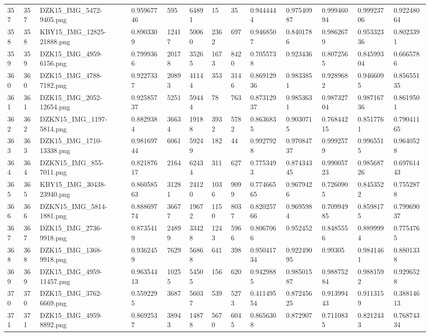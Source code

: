 \documentclass[11pt, a4paper, twoside]{report}
\begin{document}
\begin{longtable}[c]{@{}lllllllllllll@{}}
357 & 357 & DZK15\_IMG\_5472-9405.png & 0.95967746 & 595 & 64891 & 15 & 35 & 0.9444444 & 0.97540987 & 0.99946094 & 0.99923706 & 0.92248064 \\
358 & 358 & KBY15\_IMG\_12825-21888.png & 0.8903309 & 12417 & 50060 & 2362 & 697 & 0.9468507 & 0.8401786 & 0.9862679 & 0.95332336 & 0.8023391 \\
359 & 359 & DZK15\_IMG\_4959-6156.png & 0.7999366 & 20178 & 35265 & 1673 & 8420 & 0.7055738 & 0.923436 & 0.8072565 & 0.84599304 & 0.6665786 \\
360 & 360 & DZK15\_IMG\_4788-7182.png & 0.9227337 & 20893 & 41144 & 353 & 3146 & 0.86912936 & 0.9833851 & 0.9289682 & 0.9466095 & 0.85655135 \\
361 & 361 & DZK15\_IMG\_2052-12654.png & 0.92585737 & 5251 & 59444 & 78 & 763 & 0.87312937 & 0.9853631 & 0.98732704 & 0.98716736 & 0.8619501 \\
362 & 362 & DZKN15\_IMG\_1197-5814.png & 0.8829384 & 36634 & 19188 & 3932 & 5782 & 0.8636835 & 0.9030715 & 0.76844215 & 0.8517761 & 0.79041165 \\
363 & 363 & DZK15\_IMG\_1710-13338.png & 0.98169744 & 6061 & 59249 & 182 & 44 & 0.9927928 & 0.97084737 & 0.9992579 & 0.9965515 & 0.9640528 \\
364 & 364 & DZKN15\_IMG\_855-7011.png & 0.82187617 & 2164 & 62434 & 311 & 627 & 0.7753493 & 0.87434345 & 0.99005723 & 0.98568726 & 0.69761443 \\
365 & 365 & KBY15\_IMG\_30438-23940.png & 0.86058563 & 31281 & 24120 & 1036 & 9099 & 0.77466565 & 0.9679426 & 0.7260905 & 0.8453522 & 0.7552878 \\
366 & 366 & DZKN15\_IMG\_5814-1881.png & 0.88869774 & 36677 & 19672 & 1150 & 8037 & 0.82025766 & 0.9695984 & 0.70994985 & 0.8598175 & 0.79969037 \\
367 & 367 & DZK15\_IMG\_2736-9918.png & 0.8735419 & 24899 & 33428 & 1243 & 5966 & 0.8067066 & 0.952452 & 0.8485556 & 0.8899994 & 0.7754765 \\
368 & 368 & DZK15\_IMG\_1368-9918.png & 0.9362459 & 7629 & 56868 & 641 & 398 & 0.95041734 & 0.92249095 & 0.99305 & 0.9841461 & 0.8801338 \\
369 & 369 & DZK15\_IMG\_4959-11457.png & 0.96354413 & 10255 & 54505 & 156 & 620 & 0.9429885 & 0.98501587 & 0.98875284 & 0.9881592 & 0.9296528 \\
370 & 370 & DZK15\_IMG\_3762-6669.png & 0.5592295 & 3687 & 56037 & 539 & 5273 & 0.41149554 & 0.87245625 & 0.91399443 & 0.9113159 & 0.38814613 \\
371 & 371 & DZK15\_IMG\_4959-8892.png & 0.8692537 & 38943 & 14878 & 5670 & 6045 & 0.8656308 & 0.872907 & 0.7110835 & 0.8212433 & 0.76874334 \\

\end{longtable}
\end{document}

